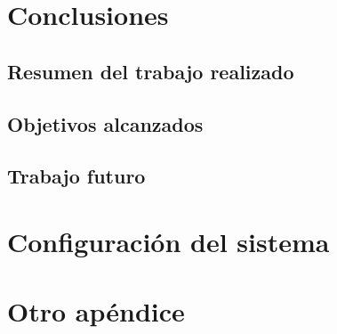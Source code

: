 \documentclass[11pt,spanish,listoffigures,listoftables]{tfgetsinf}
\begin{document}
\chapter{Conclusiones}  %

\section{Resumen del trabajo realizado} %

\section{Objetivos alcanzados}         %

\section{Trabajo futuro}               %


\printbibliography 
\cleardoublepage


\APPENDIX

\chapter{Configuración del sistema}

\chapter{Otro apéndice}
\end{document}
